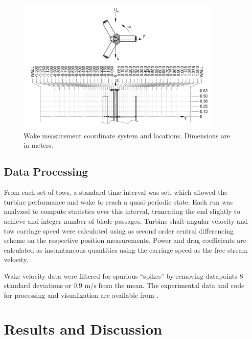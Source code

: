 \documentclass[energies,article,accept,moreauthors,pdftex,12pt,a4paper]{mdpi}
\begin{document}
\begin{figure}
\centering
\includegraphics[width=0.9\textwidth]{figures/turbine_coordinate_system}
\caption{Wake measurement coordinate system and locations. Dimensions are in
meters.}
\label{fig:wake-locations}
\end{figure}


\subsection{Data Processing}

From each set of tows, a standard time interval was set, which allowed the
turbine performance and wake to reach a quasi-periodic state. Each run was
analyzed to compute statistics over this interval, truncating the end slightly
to achieve and integer number of blade passages. Turbine shaft angular velocity
and tow carriage speed were calculated using as second order central
differencing scheme on the respective position measurements. Power and drag
coefficients are calculated as instantaneous quantities using the carriage speed
as the free stream velocity.

Wake velocity data were filtered for spurious ``spikes'' by removing datapoints
8 standard deviations or 0.9 m/s from the mean. The experimental data and code
for processing and visualization are available from
\cite{Bachant2015-RVAT-Re-dep-data}.


\section{Results and Discussion}
\end{document}
